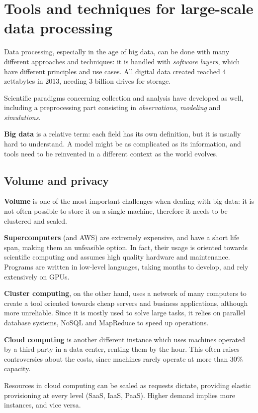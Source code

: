 
\section{Tools and techniques for large-scale data processing}
Data processing, especially in the age of big data, can be done with many different approaches and techniques: it is handled with \textit{software layers}, which have different principles and use cases. All digital data created reached 4 zettabytes in 2013, needing 3 billion drives for storage.

Scientific paradigms concerning collection and analysis have developed as well, including a preprocessing part consisting in \textit{observations}, \textit{modeling} and \textit{simulations}.

\textbf{Big data} is a relative term: each field has its own definition, but it is usually hard to understand. A model might be as complicated as its information, and tools need to be reinvented in a different context as the world evolves.

\subsection{Volume and privacy}
\textbf{Volume} is one of the most important challenges when dealing with big data: it is not often possible to store it on a single machine, therefore it needs to be clustered and scaled. 

\textbf{Supercomputers} (and AWS) are extremely expensive, and have a short life span, making them an unfeasible option. In fact, their usage is oriented towards scientific computing and assumes high quality hardware and maintenance. Programs are written in low-level languages, taking months to develop, and rely extensively on GPUs.

\textbf{Cluster computing}, on the other hand, uses a network of many computers to create a tool oriented towards cheap servers and business applications, although more unreliable. Since it is mostly used to solve large tasks, it relies on parallel database systems, NoSQL and MapReduce to speed up operations. 

\textbf{Cloud computing} is another different instance which uses machines operated by a third party in a data center, renting them by the hour. This often raises controversies about the costs, since machines rarely operate at more than 30\% capacity.

Resources in cloud computing can be scaled as requests dictate, providing elastic provisioning at every level (SaaS, IaaS, PaaS). Higher demand implies more instances, and vice versa.

